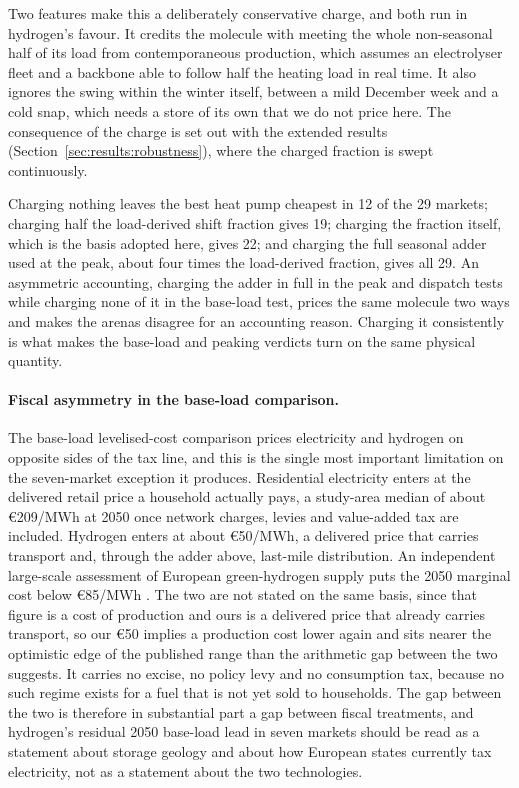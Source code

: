 Two features make this a deliberately conservative charge, and both run in hydrogen's
favour. It credits the molecule with meeting the whole non-seasonal half of its load
from contemporaneous production, which assumes an electrolyser fleet and a backbone able
to follow half the heating load in real time. It also ignores the swing within the
winter itself, between a mild December week and a cold snap, which needs a store of its
own that we do not price here. The consequence of the charge is set out with the
extended results (Section~\ref{sec:results:robustness}), where the charged fraction is
swept continuously.

Charging nothing leaves the best heat pump cheapest in 12 of the 29 markets; charging half the load-derived shift fraction gives
19; charging the fraction itself, which is the basis adopted here, gives 22; and
charging the full seasonal adder used at the peak, about four times the load-derived
fraction, gives all 29. An asymmetric accounting, charging the adder in full in the peak
and dispatch tests while charging none of it in the base-load test, prices the same
molecule two ways and makes the arenas disagree for an accounting reason. Charging
it consistently is what makes the base-load and peaking verdicts turn on the same
physical quantity.

\paragraph{Fiscal asymmetry in the base-load comparison.} The base-load levelised-cost
comparison prices electricity and hydrogen on opposite sides of the tax line, and this
is the single most important limitation on the seven-market exception it produces.
Residential
electricity enters at the delivered retail price a household actually pays, a
study-area median of about \euro{}209/MWh at 2050 once network charges, levies and
value-added tax are included. Hydrogen enters at about \euro{}50/MWh, a
delivered price that carries transport and, through the adder above, last-mile
distribution. An independent large-scale assessment of European green-hydrogen supply
puts the 2050 marginal cost below \euro{}85/MWh \citep{Buhler2025hydrogenEU}. The two are not
stated on the same basis, since that figure is a cost of production and ours is a delivered
price that already carries transport, so our \euro{}50 implies a production cost lower again
and sits nearer the optimistic edge of the published range than the arithmetic gap between
the two suggests. It carries
no excise, no policy levy and no consumption tax, because
no such regime exists for a fuel that is not yet sold to households. The gap between
the two is therefore in substantial part a gap between fiscal treatments, and
hydrogen's residual 2050 base-load lead in seven markets should be read as a statement
about storage geology and about how European states
currently tax electricity, not as a statement about the two technologies.

